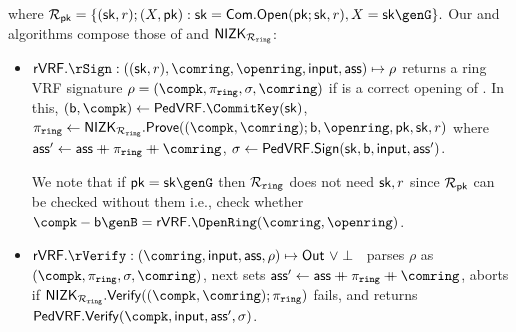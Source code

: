 where 
$\rel_{\pk} = \{(\sk,r);(X, \pk): \sk = \mathsf{Com}.\mathsf{Open}(\pk;\sk,r), X = \sk\genG\}.$
Our \Sign and \Verify algorithms compose those of \PedVRF and
 ${\mathsf{NIZK}}_{\mathcal{R}_{\mathtt{ring}}}$:
\def\tmpaux{\aux \doubleplus \piring \doubleplus \comring}
\def\tmpeprintaux{\eprint{\aux'}{\tmpaux}}
\def\tmpindent{\hspace*{5pt}}
\begin{itemize}
	\item $\rVRF.\rSign : ((\sk,r),\comring, \openring,\msg,\aux) \mapsto \rho$
	returns a ring VRF signature $\rho = (\compk,\piring,\sigma, \comring)$
	if \openring is a correct opening of \comring.  In this, $(\openpk,\compk) \leftarrow \PedVRF.\CommitKey(\sk)$,  $\piring \leftarrow \NIZK_{\Rring}.\Prove((\compk,\comring); \openpk,\openring, \pk,\sk,r)$ where  $\aux' \leftarrow \tmpaux$,  $\sigma \leftarrow {\ensuremath{\mathsf{PedVRF}}}.{\mathsf{Sign}}(\mathsf{sk},\mathsf{b},\mathsf{input}, \mathsf{ass}')$.
	
	
	We note that if $ \pk = \sk\genG $ then $ \mathcal{R}_{\mathtt{ring}} $ does not need $ \mathsf{sk},r $ since $ \mathcal{R}_{\mathsf{pk}} $ can be checked without them i.e., check whether $ \compk - \openpk \genB = \rVRF.\OpenRing(\comring,\openring) $.
	\item $\rVRF.\rVerify : (\comring,\msg,\aux,\rho) \mapsto \Out \,\, \lor \perp$ \,
	parses $\rho$ as $(\compk,\piring,\sigma,\comring)$, next sets $\aux' \leftarrow \tmpaux$,
	aborts if $\NIZK_{\Rring}.\Verify((\compk,\comring); \piring)$ fails,
	and returns $\PedVRF.\Verify(\compk,\msg, \aux', \sigma)$.
\end{itemize}





